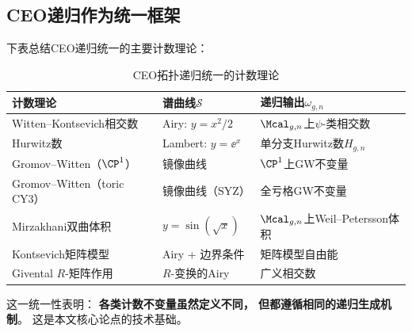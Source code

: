 \subsection{CEO递归作为统一框架}

下表总结CEO递归统一的主要计数理论：

\begin{table}[h]
\centering
\caption{CEO拓扑递归统一的计数理论}
\label{tab:unification}
\renewcommand{\arraystretch}{1.3}
\begin{tabularx}{\textwidth}{lXX}
\toprule
\textbf{计数理论} & \textbf{谱曲线$\mathcal{S}$} & \textbf{递归输出$\omega_{g,n}$} \\
\midrule
Witten--Kontsevich相交数 & Airy: $y = x^2/2$ & $\Mcal_{g,n}$上$\psi$-类相交数 \\
Hurwitz数 & Lambert: $y = \ee^x$ & 单分支Hurwitz数$H_{g,n}$ \\
Gromov--Witten（$\CP^1$） & 镜像曲线 & $\CP^1$上GW不变量 \\
Gromov--Witten（toric CY3） & 镜像曲线（SYZ） & 全亏格GW不变量 \\
Mirzakhani双曲体积 & $y = \sin(\sqrt{x})$ & $\Mcal_{g,n}$上Weil--Petersson体积 \\
Kontsevich矩阵模型 & Airy + 边界条件 & 矩阵模型自由能 \\
Givental $R$-矩阵作用 & $R$-变换的Airy & 广义相交数 \\
\bottomrule
\end{tabularx}
\end{table}

这一统一性表明：
\textbf{各类计数不变量虽然定义不同，
但都遵循相同的递归生成机制}。
这是本文核心论点的技术基础。
